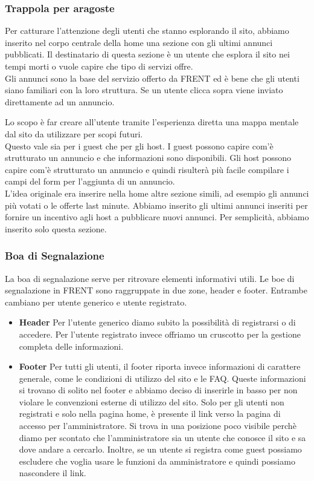 \documentclass[1_relazione.tex]{subfiles}
\begin{document}
\subsubsection{Trappola per aragoste} 
Per catturare l'attenzione degli utenti che stanno esplorando il sito, abbiamo inserito nel corpo centrale della home una sezione con gli ultimi annunci pubblicati. Il destinatario di questa sezione \`{e} un utente che esplora il sito nei tempi morti o vuole capire che tipo di servizi offre.\\
Gli annunci sono la base del servizio offerto da FRENT ed \`{e} bene che gli utenti siano familiari con la loro struttura.
Se un utente clicca sopra viene inviato direttamente ad un annuncio.

Lo scopo \`{e} far creare all'utente tramite l'esperienza diretta una mappa mentale dal sito da utilizzare per scopi futuri. \\
Questo vale sia per i guest che per gli host. I guest possono capire com'\`{e} strutturato un annuncio e che informazioni sono disponibili. Gli host possono capire com'\`{e} strutturato un annuncio e quindi risulter\`{a} pi\`{u} facile compilare i campi del form per l'aggiunta di un annuncio. \\
L'idea originale era inserire nella home altre sezione simili, ad esempio gli annunci pi\`{u} votati o le offerte last minute. Abbiamo inserito gli ultimi annunci inseriti per fornire un incentivo agli host a pubblicare nuovi annunci. Per semplicit\`{a}, abbiamo inserito solo questa sezione. \\

\subsubsection{Boa di Segnalazione}
La boa di segnalazione serve per ritrovare elementi informativi utili. Le boe di segnalazione in FRENT sono raggruppate in due zone, header e footer. Entrambe cambiano per utente generico e utente registrato.

\begin{itemize}
\item \textbf{Header}
Per l'utente generico diamo subito la possibilit\`{a} di registrarsi o di accedere. Per l'utente registrato invece offriamo un cruscotto per la gestione completa delle informazioni.
\item \textbf{Footer}
Per tutti gli utenti, il footer riporta invece informazioni di carattere generale, come le condizioni di utilizzo del sito e le FAQ. Queste informazioni si trovano di solito nel footer e abbiamo deciso di inserirle in basso per non violare le convenzioni esterne di utilizzo del sito.  Solo per gli utenti non registrati e solo nella pagina home, \`{e} presente il link verso la pagina di accesso per l'amministratore. Si trova in una posizione poco visibile perch\`{e} diamo per scontato che l'amministratore sia un utente che conosce il sito e sa dove andare a cercarlo. Inoltre, se un utente si registra come guest possiamo escludere che voglia usare le funzioni da amministratore e quindi possiamo nascondere il link.
\end{itemize}
\end{document}
